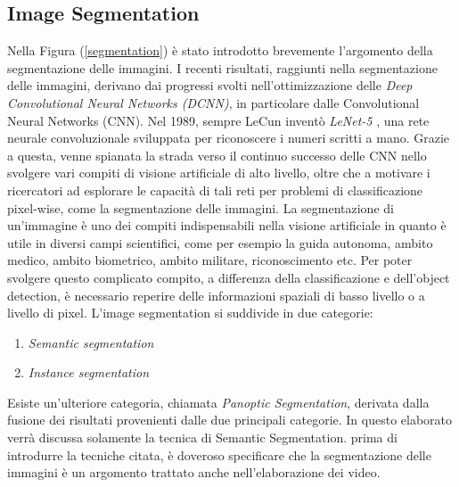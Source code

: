 \subsection{Image Segmentation}
Nella Figura (\ref{segmentation}) è stato introdotto brevemente l’argomento della segmentazione 
delle immagini.  I recenti risultati, raggiunti nella segmentazione delle immagini, 
derivano dai progressi svolti nell’ottimizzazione delle \emph{Deep Convolutional Neural 
Networks (DCNN)}, in particolare dalle Convolutional Neural Networks (CNN). 
Nel 1989, sempre LeCun inventò \emph{LeNet-5} \cite{LeNet-5}, una rete neurale convoluzionale 
sviluppata per riconoscere i numeri scritti a mano. Grazie a questa, venne spianata 
la strada verso il continuo successo delle CNN nello svolgere vari compiti di visione 
artificiale di alto livello, oltre che a motivare i ricercatori ad esplorare le capacità 
di tali reti per problemi di classificazione pixel-wise, come la segmentazione delle 
immagini. La segmentazione di un’immagine è uno dei  compiti indispensabili 
nella visione artificiale in quanto è utile in diversi campi scientifici, come per 
esempio la guida autonoma, ambito medico, ambito biometrico, ambito militare, 
riconoscimento etc. Per poter svolgere questo complicato compito, a differenza 
della classificazione e dell’object detection, è necessario reperire delle informazioni 
spaziali di basso livello o a livello di pixel.
L’image segmentation si suddivide in due categorie:
\begin{enumerate}
    \item \emph{Semantic segmentation}
    \item \emph{Instance segmentation}
\end{enumerate}
Esiste un’ulteriore categoria, chiamata \emph{Panoptic Segmentation}, derivata dalla 
fusione dei risultati provenienti dalle due principali categorie. In questo elaborato 
verrà discussa solamente la tecnica di Semantic Segmentation. prima di introdurre 
la tecniche citata, è doveroso specificare che la segmentazione delle immagini è 
un argomento trattato anche nell’elaborazione dei video.

